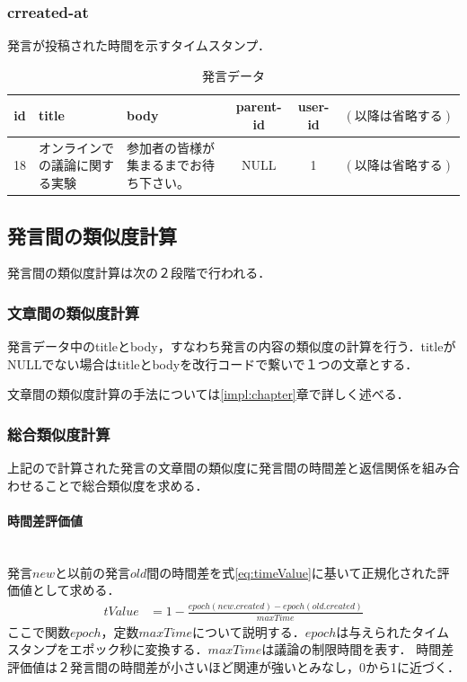 \subsubsection*{ crreated-at}
発言が投稿された時間を示すタイムスタンプ．

\begin{table}[htbp]
  \begin{tabular}{| c | p{4cm} | p{4cm} | c | c | c |} \hline
     id & title & body & parent-id & user-id & $(以降は省略する)$ \\ \hline
     18 & オンラインでの議論に関する実験 &  参加者の皆様が集まるまでお待ち下さい。 & NULL & 1 & $(以降は省略する)$ \\
     \hline
  \end{tabular}
  \caption{発言データ} \label{table:remarkData}
\end{table}

\subsection{発言間の類似度計算}
\label{model:simRemarkl}
発言間の類似度計算は次の２段階で行われる．
\subsubsection*{ 文章間の類似度計算}
\label{model:simRemark:1}
発言データ中のtitleとbody，すなわち発言の内容の類似度の計算を行う．titleがNULLでない場合はtitleとbodyを改行コードで繋いで１つの文章とする．

文章間の類似度計算の手法については\ref{impl:chapter}章で詳しく述べる．
\subsubsection*{ 総合類似度計算}
上記ので計算された発言の文章間の類似度に発言間の時間差と返信関係を組み合わせることで総合類似度を求める．
\paragraph{時間差評価値}\ \\
発言$new$と以前の発言$old$間の時間差を式\ref{eq:timeValue}に基いて正規化された評価値として求める．
\begin{equation}
\begin{aligned}
\label{eq:timeValue}
tValue & = 1 - \frac{ epoch(new.created) - epoch(old.created) }{ maxTime }
\end{aligned}
\end{equation}
ここで関数$epoch$，定数$maxTime$について説明する．$epoch$は与えられたタイムスタンプをエポック秒に変換する．$maxTime$は議論の制限時間を表す．%
時間差評価値は２発言間の時間差が小さいほど関連が強いとみなし，0から1に近づく．

